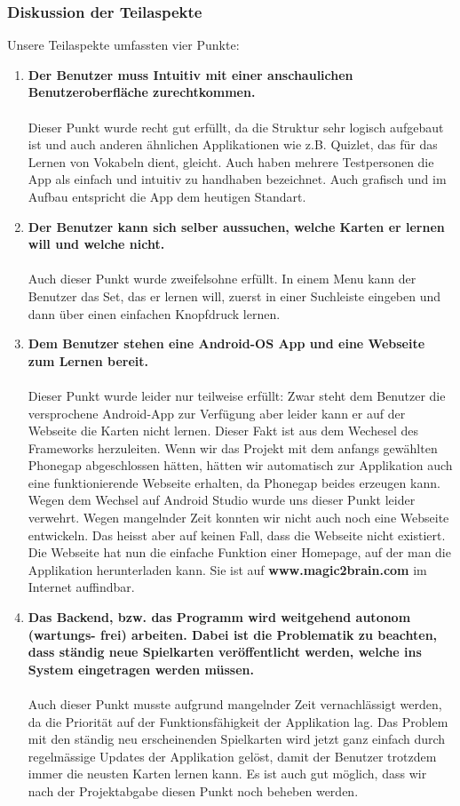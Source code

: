 \subsubsection{Diskussion der Teilaspekte}
Unsere Teilaspekte umfassten vier Punkte: 
\begin{enumerate}
\item
\textbf{Der Benutzer muss Intuitiv mit einer anschaulichen Benutzeroberfläche
zurechtkommen.}
\\
\\
Dieser Punkt wurde recht gut erfüllt, da die Struktur sehr logisch aufgebaut ist und auch anderen ähnlichen Applikationen wie z.B. Quizlet, das für das Lernen von Vokabeln dient, gleicht. Auch haben mehrere Testpersonen die App als einfach und intuitiv zu handhaben bezeichnet. Auch grafisch und im Aufbau entspricht die App dem heutigen Standart.
\item
\textbf{Der Benutzer kann sich selber aussuchen, welche Karten er lernen will und
welche nicht.}
\\
\\
Auch dieser Punkt wurde zweifelsohne erfüllt. In einem Menu kann der Benutzer das Set, das er lernen will, zuerst in einer Suchleiste eingeben und dann über einen einfachen Knopfdruck lernen. 
\item
\textbf{Dem Benutzer stehen eine Android-OS App und eine Webseite zum Lernen
bereit.}
\\
\\
Dieser Punkt wurde leider nur teilweise erfüllt: Zwar steht dem Benutzer die versprochene Android-App zur Verfügung aber leider kann er auf der Webseite die Karten nicht lernen. Dieser Fakt ist aus dem Wechesel des Frameworks herzuleiten. Wenn wir das Projekt mit dem anfangs gewählten Phonegap abgeschlossen hätten, hätten wir automatisch zur Applikation auch eine funktionierende Webseite erhalten, da Phonegap beides erzeugen kann. Wegen dem Wechsel auf Android Studio wurde uns dieser Punkt leider verwehrt. Wegen mangelnder Zeit konnten wir nicht auch noch eine Webseite entwickeln. Das heisst aber auf keinen Fall, dass die Webseite nicht existiert. Die Webseite hat nun die einfache Funktion einer Homepage, auf der man die Applikation herunterladen kann. Sie ist auf \textbf{www.magic2brain.com} im Internet auffindbar.
\item
\textbf{Das Backend, bzw. das Programm wird weitgehend autonom (wartungs-
frei) arbeiten. Dabei ist die Problematik zu beachten, dass ständig neue
Spielkarten veröffentlicht werden, welche ins System eingetragen werden
müssen.}
\\
\\
Auch dieser Punkt musste aufgrund mangelnder Zeit vernachlässigt werden, da die Priorität auf der Funktionsfähigkeit der Applikation lag. Das Problem mit den ständig neu erscheinenden Spielkarten wird jetzt ganz einfach durch regelmässige Updates der Applikation gelöst, damit der Benutzer trotzdem immer die neusten Karten lernen kann. Es ist auch gut möglich, dass wir nach der Projektabgabe diesen Punkt noch beheben werden.
\end{enumerate}

